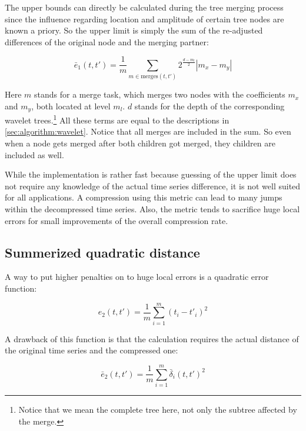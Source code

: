 The upper bounds can directly be calculated during the tree merging process since the influence regarding location and amplitude of certain tree nodes are known a priory. So the upper limit is simply the sum of the re-adjusted differences of the original node and the merging partner:

\begin{equation}\label{eq:e1_up}
    \bar{e}_1\left(t, t'\right) = \frac{1}{m} \sum_{m \in \mathrm{merges}(t, t')} 2^\frac{d - m_l}{2} \left|m_x - m_y\right|
\end{equation}

Here $m$ stands for a merge task, which merges two nodes with the coefficients $m_x$ and $m_y$, both located at level $m_l$. $d$ stands for the depth of the corresponding wavelet trees.\footnote{Notice that we mean the complete tree here, not only the subtree affected by the merge.} All these terms are equal to the descriptions in \autoref{sec:algorithm:wavelet}. Notice that all merges are included in the sum. So even when a node gets merged after both children got merged, they children are included as well.

While the implementation is rather fast because guessing of the upper limit does not require any knowledge of the actual time series difference, it is not well suited for all applications. A compression using this metric can lead to many jumps within the decompressed time series. Also, the metric tends to sacrifice huge local errors for small improvements of the overall compression rate.


\subsection{Summerized quadratic distance}
\label{ssec:algorithm:error:quadratic}

A way to put higher penalties on to huge local errors is a quadratic error function:

\begin{equation}\label{eq:e2}
    e_2\left(t, t'\right) = \frac{1}{m} \sum_{i=1}^m \left(t_i - t'_i\right)^2
\end{equation}

A drawback of this function is that the calculation requires the actual distance of the original time series and the compressed one:

\begin{equation}\label{eq:e2_up}
    \bar{e}_2\left(t, t'\right) = \frac{1}{m} \sum_{i=1}^m \bar{\delta}_i(t, t')^2
\end{equation}


